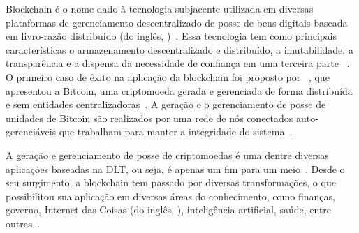 \newcommand{\comando}[1]{\textbf{$\backslash$#1}}




Blockchain é o nome dado à tecnologia subjacente utilizada em diversas plataformas de gerenciamento descentralizado de posse de bens digitais baseada em livro-razão distribuído (do inglês,  )~\cite{kannengiesser2020trade-offs-acmcs}. Essa tecnologia tem como principais características o armazenamento descentralizado e distribuído, a imutabilidade, a transparência e a dispensa da necessidade de confiança em uma terceira parte ~\cite{fan2020performance, overview-dinh-2018}. O primeiro caso de êxito na aplicação da blockchain foi proposto por ~, que apresentou a Bitcoin, uma criptomoeda gerada e gerenciada de forma distribuída e sem entidades centralizadoras~\cite{zhang2019blockchain-security-acmcs}. A geração e o gerenciamento de posse de unidades de Bitcoin são realizados por uma rede de nós conectados auto-gerenciáveis que trabalham para manter a integridade do sistema~\cite{overview-dinh-2018}. 


A geração e gerenciamento de posse de criptomoedas é uma dentre diversas aplicações baseadas na DLT, ou seja, é apenas um fim para um meio~\cite{overview-blockchainbasic2018drescher}. Desde o seu surgimento, a blockchain tem passado por diversas transformações, o que possibilitou sua aplicação em diversas áreas do conhecimento, como finanças, governo, Internet das Coisas (do inglês, ), inteligência artificial, saúde, entre outras~\cite{swan2015blockchain-book, maesa2020blockchain3.0, zhu2019iot-applications, salah2019review-blockchain-ai, erikson2020survey-health}. 

